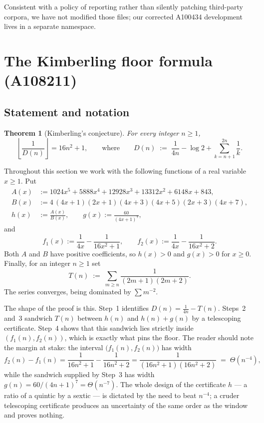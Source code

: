 \documentclass[11pt]{article}
\theoremstyle{plain}
\newtheorem{theorem}{Theorem}[section]
\theoremstyle{definition}
\theoremstyle{remark}
\numberwithin{equation}{section}
\begin{document}
Consistent with a policy of reporting rather than silently patching third-party corpora, we have
not modified those files; our corrected A100434 development lives in a separate namespace.

\section{The Kimberling floor formula (A108211)}
\label{sec:a108211}

\subsection{Statement and notation}

\begin{theorem}[Kimberling's conjecture]
\label{thm:a108211}
For every integer $n \ge 1$,
\[
  \left\lfloor \frac{1}{D(n)} \right\rfloor = 16n^2 + 1,
  \qquad\text{where}\qquad
  D(n) \;:=\; \frac{1}{4n} - \log 2 + \sum_{k=n+1}^{2n} \frac1k .
\]
\end{theorem}

Throughout this section we work with the following functions of a real variable $x \ge 1$. Put
\begin{align}
  A(x) &:= 1024x^5 + 5888x^4 + 12928x^3 + 13312x^2 + 6148x + 843,
  \label{eq:Apoly}\\
  B(x) &:= 4\,(4x+1)(2x+1)(4x+3)(4x+5)(2x+3)(4x+7),
  \label{eq:Bpoly}\\
  h(x) &:= \frac{A(x)}{B(x)}, \qquad
  g(x) := \frac{60}{(4x+1)^7},
  \label{eq:hg}
\end{align}
and
\begin{equation}
  f_1(x) := \frac{1}{4x} - \frac{1}{16x^2+1},
  \qquad
  f_2(x) := \frac{1}{4x} - \frac{1}{16x^2+2}.
  \label{eq:f1f2}
\end{equation}
Both $A$ and $B$ have positive coefficients, so $h(x) > 0$ and $g(x) > 0$ for $x \ge 0$.
Finally, for an integer $n \ge 1$ set
\begin{equation}
  T(n) \;:=\; \sum_{m \ge n} \frac{1}{(2m+1)(2m+2)} .
  \label{eq:Tdef}
\end{equation}
The series converges, being dominated by $\sum m^{-2}$.

The shape of the proof is this. Step~1 identifies $D(n) = \frac{1}{4n} - T(n)$. Steps~2 and~3
sandwich $T(n)$ between $h(n)$ and $h(n)+g(n)$ by a telescoping certificate. Step~4 shows that
this sandwich lies strictly inside $(f_1(n), f_2(n))$, which is exactly what pins the floor.
The reader should note the margin at stake: the interval
$\bigl(f_1(n), f_2(n)\bigr)$ has width
\[
  f_2(n) - f_1(n) = \frac{1}{16n^2+1} - \frac{1}{16n^2+2}
    = \frac{1}{(16n^2+1)(16n^2+2)} \;=\; \Theta(n^{-4}),
\]
while the sandwich supplied by Step~3 has width $g(n) = 60/(4n+1)^7 = \Theta(n^{-7})$. The
whole design of the certificate $h$ --- a ratio of a quintic by a sextic --- is dictated by the
need to beat $n^{-4}$; a cruder telescoping certificate produces an uncertainty of the same
order as the window and proves nothing.
\end{document}

